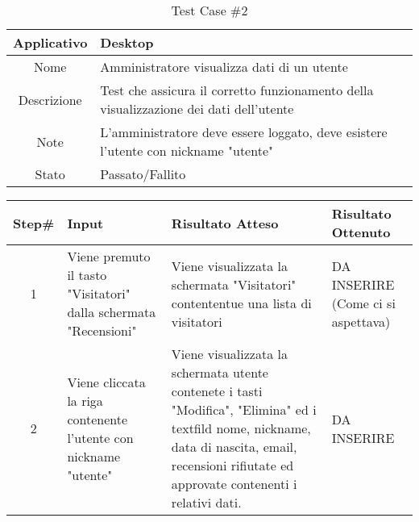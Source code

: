 
\begin{table}[H]
    \footnotesize
    \caption{Test Case \#2}
    \begin{tabularx}{\textwidth}{|c|X|}
        \hline
        Applicativo & Desktop\\
        \hline
        Nome & Amministratore visualizza dati di un utente  \\
        \hline
        Descrizione & Test che assicura il corretto funzionamento della visualizzazione dei dati dell'utente\\
        \hline
        Note & L'amministratore deve essere loggato, deve esistere l'utente con nickname "utente" \\
        \hline
        Stato & Passato/Fallito\\
        \hline

    \end{tabularx}
    \setlength{\tabcolsep}{8pt}
    \renewcommand{\arraystretch}{1.5}
\end{table}

\begin{table}[H]
    \footnotesize
    \begin{tabularx}{\textwidth}{|c|X|X|X|}
        \hline
        Step\# & Input & Risultato Atteso & Risultato Ottenuto \\
        \hline
         1 & Viene premuto il tasto "Visitatori" dalla schermata "Recensioni" 
         & Viene visualizzata la schermata "Visitatori" contententue una lista di visitatori
         &DA INSERIRE (Come ci si aspettava)\\
          \hline
        2 & Viene cliccata la riga contenente l'utente con nickname "utente"
        & Viene visualizzata la schermata utente contenete i tasti "Modifica", "Elimina" ed i textfild nome, nickname, data di nascita, email, recensioni rifiutate ed approvate contenenti i relativi dati.
        & DA INSERIRE\\
         \hline  
    \end{tabularx}
\end{table}
    
       
